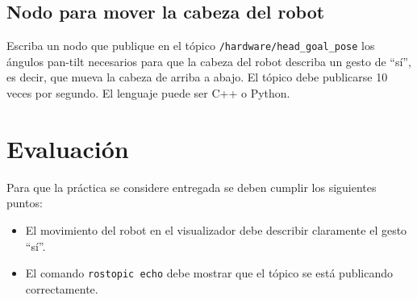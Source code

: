 \documentclass[letterpaper,12pt]{article}
\begin{document}
\subsection{Nodo para mover la cabeza del robot}
Escriba un nodo que publique en el tópico \texttt{/hardware/head\_goal\_pose} los ángulos pan-tilt necesarios para que la cabeza del robot describa un gesto de ``sí'', es decir, que mueva la cabeza de arriba a abajo. El tópico debe publicarse 10 veces por segundo. El lenguaje puede ser C++ o Python.

\section{Evaluación}
Para que la práctica se considere entregada se deben cumplir los siguientes puntos:
\begin{itemize}
\item El movimiento del robot en el visualizador debe describir claramente el gesto ``sí''.
\item El comando \texttt{rostopic echo} debe mostrar que el tópico se está publicando correctamente.
\end{itemize}
\end{document}
